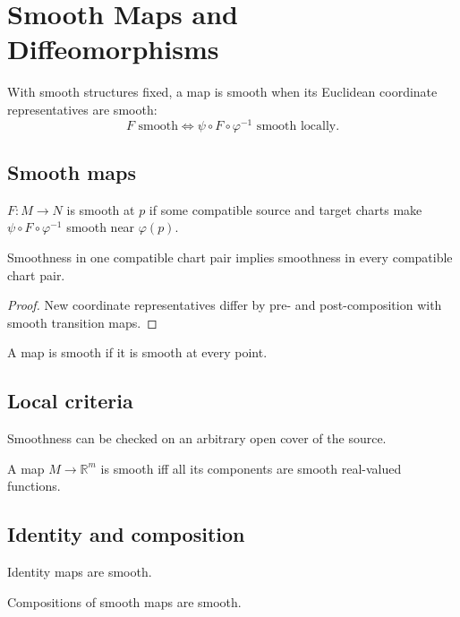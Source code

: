 \chapter{Smooth Maps and Diffeomorphisms}
\label{ch:vii03-smooth-maps-and-diffeomorphisms}

With smooth structures fixed, a map is smooth when its Euclidean coordinate representatives are smooth:
\[
\boxed{F\text{ smooth}\iff \psi\circ F\circ\varphi^{-1}\text{ smooth locally}.}
\]

\section{Smooth maps}
\begin{definition}\label{def:vii03-smooth-map}
\(F:M\to N\) is smooth at \(p\) if some compatible source and target charts make \(\psi\circ F\circ\varphi^{-1}\) smooth near \(\varphi(p)\).
\end{definition}
\begin{theorem}\label{thm:vii03-chart-independence}
Smoothness in one compatible chart pair implies smoothness in every compatible chart pair.
\end{theorem}
\begin{proof}
New coordinate representatives differ by pre- and post-composition with smooth transition maps.
\end{proof}
\begin{definition}\label{def:vii03-global-smooth}
A map is smooth if it is smooth at every point.
\end{definition}

\section{Local criteria}
\begin{theorem}[Locality]\label{thm:vii03-locality}
Smoothness can be checked on an arbitrary open cover of the source.
\end{theorem}
\begin{proposition}\label{prop:vii03-componentwise}
A map \(M\to\mathbb R^m\) is smooth iff all its components are smooth real-valued functions.
\end{proposition}

\section{Identity and composition}
\begin{proposition}[Identity]\label{prop:vii03-identity}
Identity maps are smooth.
\end{proposition}
\begin{theorem}[Composition]\label{thm:vii03-composition}
Compositions of smooth maps are smooth.
\end{theorem}

